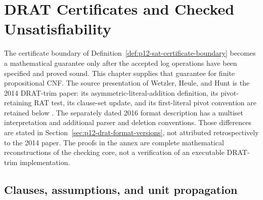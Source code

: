 \chapter{DRAT Certificates and Checked Unsatisfiability}
\label{sec:p12-drat-certificates-and-checking}

The certificate boundary of
Definition~\ref{def:p12-sat-certificate-boundary} becomes a mathematical
guarantee only after the accepted log operations have been specified and proved
sound.  This chapter supplies that guarantee for finite propositional CNF.
The source presentation of Wetzler, Heule, and Hunt is the 2014 DRAT-trim
paper: its asymmetric-literal-addition definition, its pivot-retaining RAT
test, its clause-set update, and its first-literal pivot convention are retained
below \cite[Secs.~2--3]{WetzlerHeuleHunt2014AuthorDRAT}.  The separately dated
2016 format description has a multiset interpretation and additional parser
and deletion conventions.  Those differences are stated in
Section~\ref{sec:p12-drat-format-versions}, not attributed retrospectively to
the 2014 paper.  The proofs in the annex are complete mathematical
reconstructions of the checking core, not a verification of an executable
DRAT-trim implementation.

\section{Clauses, assumptions, and unit propagation}

